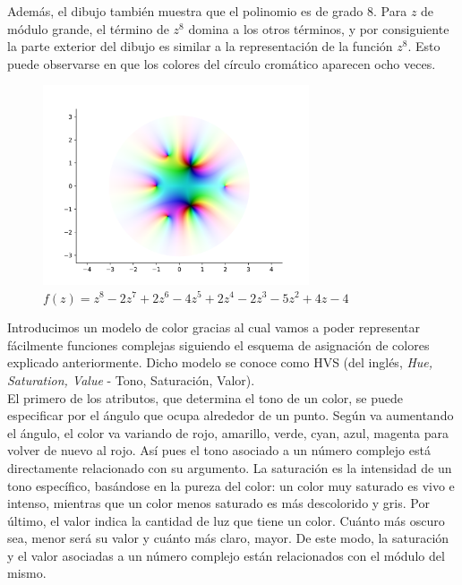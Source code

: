 Además, el dibujo también muestra que el polinomio es de grado $8$. Para $z$ de módulo grande, el término de $z^8$ domina a los otros términos, y por consiguiente la parte exterior del dibujo es similar a la representación de la función $z^8$. Esto puede observarse en que los colores del círculo cromático aparecen ocho veces. \\

\begin{figure}[!htbp]
    \centering
    \includegraphics[width=0.7\textwidth]{../Aplicacion/z^8-2z^7+2z^6-4z^5+2z^4-2z^3-5z^2+4z-4.png}
    \caption{$f(z) = z^8-2z^7+2z^6-4z^5+2z^4-2z^3-5z^2+4z-4$}
    \label{fig:z^8-2z^7+2z^6-4z^5+2z^4-2z^3-5z^2+4z-4}
\end{figure}

Introducimos un modelo de color gracias al cual vamos a poder representar fácilmente funciones complejas siguiendo el esquema de asignación de colores explicado anteriormente. Dicho modelo se conoce como HVS (del inglés, \textit{Hue, Saturation, Value} - Tono, Saturación, Valor). \\

El primero de los atributos, que determina el tono de un color, se puede especificar por el ángulo que ocupa alrededor de un punto. Según va aumentando el ángulo, el color va variando de rojo, amarillo, verde, cyan, azul, magenta para volver de nuevo al rojo. Así pues el tono asociado a un número complejo está directamente relacionado con su argumento. La saturación es la intensidad de un tono específico, basándose en la pureza del color: un color muy saturado es vivo e intenso, mientras que un color menos saturado es más descolorido y gris. Por último, el valor indica la cantidad de luz que tiene un color. Cuánto más oscuro sea, menor será su valor y cuánto más claro, mayor. De este modo, la saturación y el valor asociadas a un número complejo están relacionados con el módulo del mismo. \\

